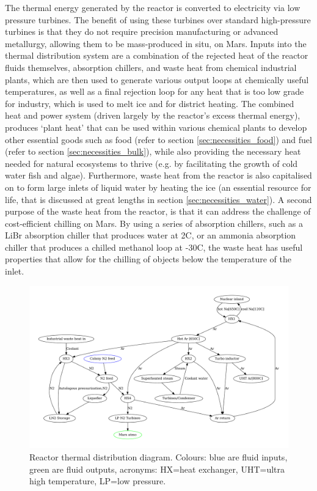 \documentclass[fleqn,10pt]{Stylesheet} %
\begin{document}
The thermal energy generated by the reactor is converted to electricity via low pressure turbines. The benefit of using these turbines over standard high-pressure turbines is that they do not require precision manufacturing or advanced metallurgy, allowing them to be mass-produced in situ, on Mars. Inputs into the thermal distribution system are a combination of the rejected heat of the reactor fluids themselves, absorption chillers, and waste heat from chemical industrial plants, which are then used to generate various output loops at chemically useful temperatures, as well as a final rejection loop for any heat that is too low grade for industry, which is used to melt ice and for district heating. The combined heat and power system (driven largely by the reactor’s excess thermal energy), produces ‘plant heat’ that can be used within various chemical plants to develop other essential goods such as food (refer to section \ref{sec:necessities_food}) and fuel (refer to section \ref{sec:necessities_bulk}), while also providing the necessary heat needed for natural ecosystems to thrive (e.g. by facilitating the growth of cold water fish and algae). Furthermore, waste heat from the reactor is also capitalised on to form large inlets of liquid water by heating the ice (an essential resource for life, that is discussed at great lengths in section \ref{sec:necessities_water}). A second purpose of the waste heat from the reactor, is that it can address the challenge of cost-efficient chilling on Mars. By using a series of absorption chillers, such as a LiBr absorption chiller that produces water at 2\degree{}C, or an ammonia absorption chiller that produces a chilled methanol loop at -30\degree{}C, the waste heat has useful properties that allow for the chilling of objects below the temperature of the inlet.

\begin{figure}
    \centering
    \includegraphics[width=\linewidth]{figures/fig_power.pdf}
    \caption{Reactor thermal distribution diagram. 
    Colours: blue are fluid inputs, green are fluid outputs, acronyms: HX=heat exchanger, UHT=ultra high temperature, LP=low pressure.} 
    \label{fig:power_diagram}
\end{figure}
\end{document}
